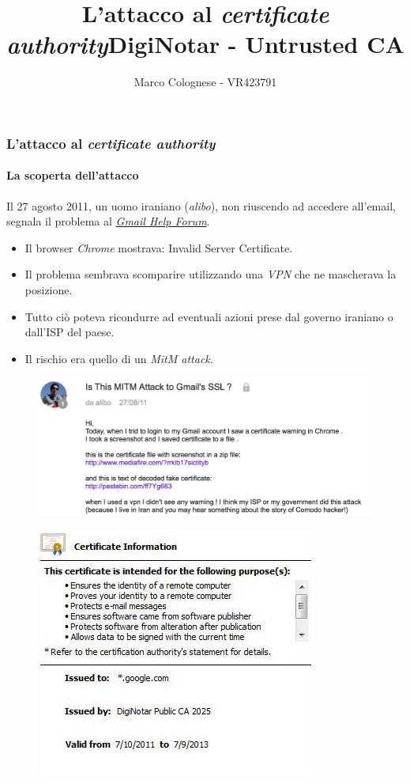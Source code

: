 \documentclass{beamer}
\begin{document}
\title{L'attacco al \textit{certificate authority}}
\subtitle{}
\institute{}
\author{}
\begin{frame}
	\titlepage
\end{frame}
\title{DigiNotar - Untrusted CA}
\author{Marco Colognese - VR423791}

\begin{frame}
\frametitle{L'attacco al \textit{certificate authority}}
\framesubtitle{La scoperta dell'attacco}
Il 27 agosto 2011, un \alert{uomo iraniano} (\textit{alibo}), non riuscendo ad \alert{accedere} all'\alert{email}, segnala il problema al \href{https://productforums.google.com/forum/\#!topic/gmail/3J3r2JqFNTw/discussion}{\alert{\textit{Gmail Help Forum}}}.
\begin{itemize}
	\item Il browser \textit{Chrome} mostrava: \alert{Invalid Server Certificate}.
	\item Il problema sembrava scomparire utilizzando una \alert{\textit{VPN}} che ne mascherava la posizione.
	\item Tutto ciò poteva ricondurre ad eventuali azioni prese dal \alert{governo iraniano} o dall'ISP del paese.
	\item Il rischio era quello di un \textit{\alert{MitM attack}}.
\end{itemize}
\begin{multicols}{2}
	\begin{figure}[H]
		\centering
		\includegraphics[scale=0.29]{alibo}
	\end{figure}
	\columnbreak
	\begin{figure}[H]
		\centering
		\includegraphics[width=.4\textwidth, right]{invalid}
	\end{figure}
\end{multicols}
\end{frame}
\end{document}
